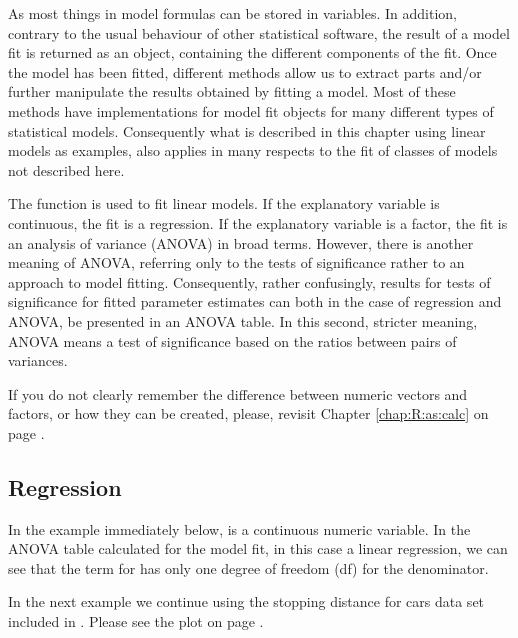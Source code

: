 \documentclass[krantz2]{krantz}\usepackage{knitr}%
\begin{document}
As most things in \Rlang model formulas can be stored in variables. In addition, contrary to the usual behaviour of other statistical software, the result of a model fit is returned as an object, containing the different components of the fit. Once the model has been fitted, different methods allow us to extract parts and/or further manipulate the results obtained by fitting a model. Most of these methods have implementations for model fit objects for many different types of statistical models. Consequently what is described in this chapter using linear models as examples, also applies in many respects to the fit of classes of models not described here.

The \Rlang function  is used to fit linear models. If the explanatory variable is continuous, the fit is a regression. If the explanatory variable is a factor, the fit is an analysis of variance (ANOVA) in broad terms. However, there is another meaning of ANOVA, referring only to the tests of significance rather to an approach to model fitting. Consequently, rather confusingly, results for tests of significance for fitted parameter estimates can both in the case of regression and ANOVA, be presented in an ANOVA table. In this second, stricter meaning, ANOVA means a test of significance based on the ratios between pairs of variances.

\begin{warningbox}
If you do not clearly remember the difference between numeric vectors and factors, or how they can be created, please, revisit Chapter \ref{chap:R:as:calc} on page \pageref{chap:R:as:calc}.
\end{warningbox}

\subsection{Regression}
In  the example immediately below,  is a continuous numeric variable. In the ANOVA table calculated for the model fit, in this case a linear regression, we can see that the term for  has only one degree of freedom (df) for the denominator.

In the next example we continue using the stopping distance for cars data set included in \Rpgrm. Please see the plot on page \pageref{chunk:plot:cars}.
\label{xmpl:fun:lm:fm1}
\end{document}
